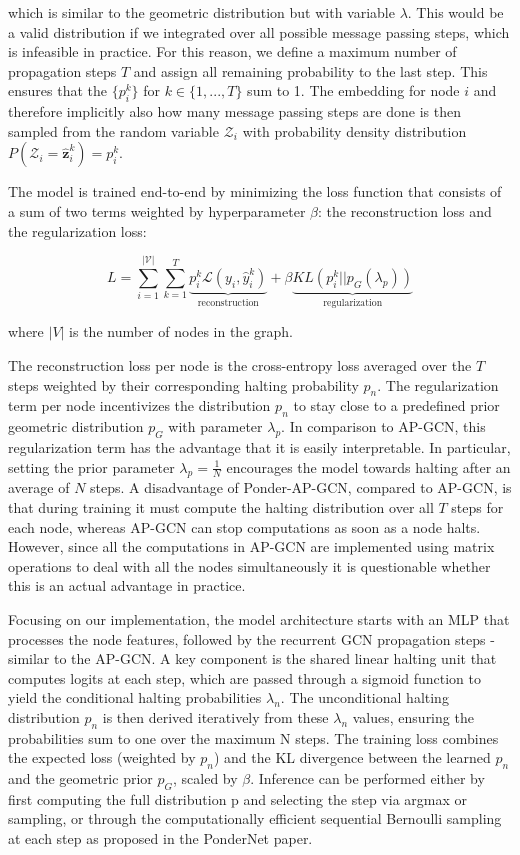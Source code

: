 \documentclass{gdl}
\begin{document}
\noindent which is similar to the geometric distribution but with variable $\lambda$. This would be a valid distribution if we integrated over all possible message passing steps, which is infeasible in practice. For this reason, we define a maximum number of propagation steps $T$ and assign all remaining probability to the last step. This ensures that the $\{p_i^k\}$ for $k\in \{1,...,T\}$ sum to 1. The embedding for node $i$ and therefore implicitly also how many message passing steps are done is then sampled from the random variable $\mathcal{Z}_i$ with probability density distribution $P(\mathcal{Z}_i=\hat{\mathbf{z}}_i^k) = p_i^k$.

The model is trained end-to-end by minimizing the loss function that consists of a sum of two terms weighted by hyperparameter $\beta$: the reconstruction loss and the regularization loss:

$$
L = \sum_{i=1}^{\mathcal{|V|}} \sum_{k=1}^{T} \underbrace{p_i^k \mathcal{L}(y_i, \hat{y}_i^k)}_{\text{reconstruction}} + \beta \underbrace{KL(p_i^k || p_G(\lambda_p))}_{\text{regularization}}
$$

\noindent where $|V|$ is the number of nodes in the graph.

\noindent The reconstruction loss per node is the cross-entropy loss averaged over the $T$ steps weighted by their corresponding halting probability $p_n$. The regularization term per node incentivizes the distribution $p_n$ to stay close to a predefined prior geometric distribution $p_G$ with parameter $\lambda_p$. In comparison to AP-GCN, this regularization term has the advantage that it is easily interpretable. In particular, setting the prior parameter $\lambda_p = \frac{1}{N}$ encourages the model towards halting after an average of $N$ steps. A disadvantage of Ponder-AP-GCN, compared to AP-GCN, is that during training it must compute the halting distribution over all $T$ steps for each node, whereas AP-GCN can stop computations as soon as a node halts. However, since all the computations in AP-GCN are implemented using matrix operations to deal with all the nodes simultaneously it is questionable whether this is an actual advantage in practice.

Focusing on our implementation, the model architecture starts with an MLP that processes the node features, followed by the recurrent GCN propagation steps - similar to the AP-GCN. A key component is the shared linear halting unit that computes logits at each step, which are passed through a sigmoid function to yield the conditional halting probabilities $\lambda_n$. The unconditional halting distribution $p_n$ is then derived iteratively from these $\lambda_n$  values, ensuring the probabilities sum to one over the maximum N steps. The training loss combines the expected loss (weighted by $p_n$) and the KL divergence between the learned $p_n$ and the geometric prior $p_G$, scaled by $\beta$. Inference can be performed either by first computing the full distribution p and selecting the step via argmax or sampling, or through the computationally efficient sequential Bernoulli sampling at each step as proposed in the PonderNet paper.
\end{document}
